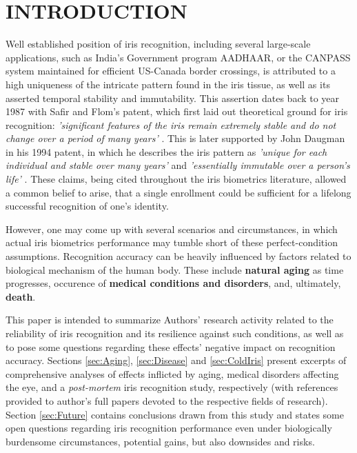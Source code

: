 \documentclass[a4paper,twoside]{article}
\begin{document}
\section{\uppercase{Introduction}}
\label{sec:Intro}
\noindent
Well established position of iris recognition, including several large-scale applications, such as India's Government program AADHAAR, or the CANPASS system maintained for efficient US-Canada border crossings, is attributed to a high uniqueness of the intricate pattern found in the iris tissue, as well as its asserted temporal stability and immutability. This assertion dates back to year 1987 with Safir and Flom's patent, which first laid out theoretical ground for iris recognition: \emph{'significant features of the iris remain extremely stable and do not change over a period of many years'} \cite{SafirFlom}. This is later supported by John Daugman in his 1994 patent, in which he describes the iris pattern as \emph{'unique for each individual and stable over many years'} and \emph{'essentially immutable over a person's life'} \cite{DaugmanPatent}. These claims, being cited throughout the iris biometrics literature, allowed a common belief to arise, that a single enrollment could be sufficient for a lifelong successful recognition of one's identity. 

However, one may come up with several scenarios and circumstances, in which actual iris biometrics performance may tumble short of these perfect-condition assumptions. Recognition accuracy can be heavily influenced by factors related to biological mechanism of the human body. These include \textbf{natural aging} as time progresses, occurence of \textbf{medical conditions and disorders}, and, ultimately, \textbf{death}. 

This paper is intended to summarize Authors' research activity related to the reliability of iris recognition and its resilience against such conditions, as well as to pose some questions regarding these effects' negative impact on recognition accuracy. Sections \ref{sec:Aging}, \ref{sec:Disease} and \ref{sec:ColdIris} present excerpts of comprehensive analyses of effects inflicted by aging, medical disorders affecting the eye, and a \emph{post-mortem} iris recognition study, respectively (with references provided to author's full papers devoted to the respective fields of research). Section \ref{sec:Future} contains conclusions drawn from this study and states some open questions regarding iris recognition performance even under biologically burdensome circumstances, potential gains, but also downsides and risks. 
\end{document}
